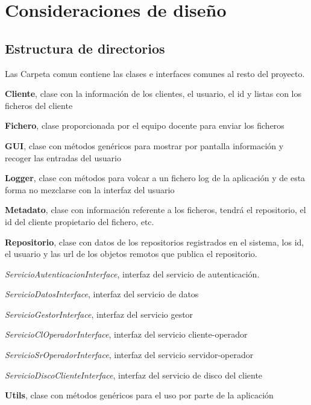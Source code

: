 \chapter{Consideraciones de diseño}

\section{Estructura de directorios}

Las Carpeta comun contiene las clases e interfaces comunes al resto del proyecto.

\begin{compactitem}
	\item \textbf{Cliente}, clase con la información de los clientes, el usuario, el id y listas con los ficheros del cliente
	\item \textbf{Fichero}, clase proporcionada por el equipo docente para enviar los ficheros
	\item \textbf{GUI}, clase con métodos genéricos para mostrar por pantalla información y recoger las entradas del usuario
	\item \textbf{Logger}, clase con métodos para volcar a un fichero log de la aplicación y de esta forma no mezclarse con la interfaz del usuario
	\item \textbf{Metadato}, clase con información referente a los ficheros, tendrá el repositorio, el id del cliente propietario del fichero, etc.
	\item \textbf{Repositorio}, clase con datos de los repositorios registrados en el sistema, los id, el usuario y las url de los objetos remotos que publica el repositorio.
	\item \textit{ServicioAutenticacionInterface}, interfaz del servicio de autenticación.
	\item \textit{ServicioDatosInterface}, interfaz del servicio de datos
	\item \textit{ServicioGestorInterface}, interfaz del servicio gestor
	\item \textit{ServicioClOperadorInterface}, interfaz del servicio cliente-operador
	\item \textit{ServicioSrOperadorInterface}, interfaz del servicio servidor-operador
	\item \textit{ServicioDiscoClienteInterface}, interfaz del servicio de disco del cliente
	\item \textbf{Utils}, clase con métodos genéricos para el uso por parte de la aplicación
\end{compactitem}


